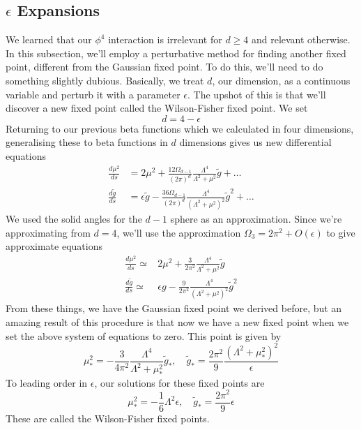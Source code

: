 \subsection{$ \epsilon $ Expansions}
We learned that our $ \phi ^ 4 $ interaction 
is irrelevant for $ d \geq 4 $ and relevant otherwise. 
In this subsection, we'll employ a perturbative method 
for finding another fixed point, different from the 
Gaussian fixed point.  
To do this, we'll need to do something slightly dubious. 
Basically, we treat $ d $, our dimension, as 
a continuous variable and perturb it with a parameter $\epsilon $. 
The upshot of this is that we'll discover a new fixed point 
called the Wilson-Fisher fixed point.  
We set 
\[
d  = 4 - \epsilon  
\] Returning to our previous beta functions 
which we calculated in four dimensions, generalising 
these to beta functions in $ d $ dimensions gives us 
new differential equations 
\begin{align*}
\frac{ d \mu ^ 2 }{ ds } &=  2 \mu ^ 2 + 
\frac{ 12 \Omega_{ d- 1 } }{ ( 2 \pi ) ^ d } \frac{ \Lambda ^ 4  }{ 
\Lambda ^ 2 + \mu ^ 2  }  \tilde{ g } + \dots  \\
\frac{ d \tilde{ g }  }{ds } &= 
\epsilon \tilde{ g } - \frac{ 36 \Omega_{ d- 1 } }{ ( 2 \pi ) ^ d }
\frac{ \Lambda ^ 4 }{ ( \Lambda ^ 2 + \mu ^ 2 ) ^ 2 } \tilde{ g } ^ 2 + \dots 
\end{align*}
We used the solid angles for the $ d -1 $ sphere as an approximation. 
Since we're approximating from $ d = 4 $, we'll 
use the approximation $ \Omega_ 3  = 2 \pi ^ 2 + O ( \epsilon ) $ 
to give approximate equations 
\begin{align*}
 \frac{ d \mu ^ 2 }{ds } \simeq & 2 \mu ^ 2 + \frac{3}{2 \pi ^ 2 } \frac{
 \Lambda ^ 4 }{ \Lambda ^ 2 + \mu ^ 2 } \tilde{ g } \\
 \frac{ d \tilde{g }  }{ds  } \simeq & 
 \epsilon g  - \frac{ 9 }{ 2 \pi ^ 2 } \frac{ \Lambda ^ 4 }{
 ( \Lambda ^ 2 + \mu ^ 2 ) ^ 2 } \tilde{g } ^ 2  
\end{align*}
From these things, we have the Gaussian 
fixed point we derived before, but 
an amazing result of this procedure is that now 
we have a new fixed point when 
we set the above system of equations to zero. 
This point is given by 
\[
\mu _{ * } ^ 2 = - \frac{3 }{ 4 \pi ^ 2 } \frac{ \Lambda ^ 4 }{ 
\Lambda ^ 2 + \mu _ * ^ 2 } \tilde{ g } _ * , \quad 
\tilde{ g } _ * = \frac{ 2 \pi ^ 2 }{ 9 } \frac{ ( \Lambda ^ 2 + \mu _ * ^ 2 ) ^ 2 }{
\epsilon } 
\] To leading order in $\epsilon $, our solutions for these 
fixed points are 
\[
\mu _ * ^ 2 =  - \frac{1}{6 } \Lambda  ^2 \epsilon , \quad 
\tilde{ g } _ *  = \frac{ 2 \pi ^ 2  }{ 9 }  \epsilon 
\] These are called the Wilson-Fisher fixed points. 

